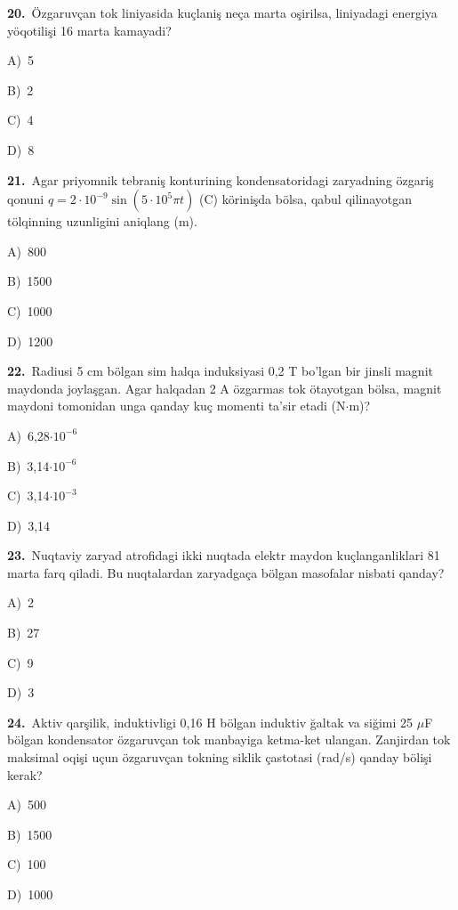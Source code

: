 \documentclass[11pt,a4paper]{article}
\newcommand{\opt}[2]{\hspace*{4mm}#1)\ #2\par}
\begin{document}
\noindent\begin{minipage}{\linewidth}
\textbf{20.}\ Özgaruvçan tok liniyasida kuçlaniş neça marta oşirilsa, liniyadagi energiya yöqotilişi 16 marta kamayadi?\par\smallskip
\opt{A}{5}
\opt{B}{2}
\opt{C}{4}
\opt{D}{8}
\end{minipage}\vspace{9pt}\par
\noindent\begin{minipage}{\linewidth}
\textbf{21.}\ Agar priyomnik tebraniş konturining kondensatoridagi zaryadning özgariş qonuni $q=2\cdot10^{-9}\sin(5\cdot10^5\pi t)$ (C) körinişda bölsa, qabul qilinayotgan tölqinning uzunligini aniqlang (m).\par\smallskip
\opt{A}{800}
\opt{B}{1500}
\opt{C}{1000}
\opt{D}{1200}
\end{minipage}\vspace{9pt}\par
\noindent\begin{minipage}{\linewidth}
\textbf{22.}\ Radiusi 5 cm bölgan sim halqa induksiyasi 0,2 T bo’lgan bir jinsli magnit maydonda joylaşgan. Agar halqadan 2 A özgarmas tok ötayotgan bölsa, magnit maydoni tomonidan unga qanday kuç momenti ta’sir etadi (N$\cdot$m)?\par\smallskip
\opt{A}{6,28$\cdot10^{-6}$}
\opt{B}{3,14$\cdot10^{-6}$}
\opt{C}{3,14$\cdot10^{-3}$}
\opt{D}{3,14}
\end{minipage}\vspace{9pt}\par
\noindent\begin{minipage}{\linewidth}
\textbf{23.}\ Nuqtaviy zaryad atrofidagi ikki nuqtada elektr maydon kuçlanganliklari 81 marta farq qiladi. Bu nuqtalardan zaryadgaça bölgan masofalar nisbati qanday?\par\smallskip
\opt{A}{2}
\opt{B}{27}
\opt{C}{9}
\opt{D}{3}
\end{minipage}\vspace{9pt}\par
\noindent\begin{minipage}{\linewidth}
\textbf{24.}\ Aktiv qarşilik, induktivligi 0,16 H bölgan induktiv ğaltak va siğimi 25 $\mu$F bölgan kondensator özgaruvçan tok manbayiga ketma-ket ulangan. Zanjirdan tok maksimal oqişi uçun özgaruvçan tokning siklik çastotasi (rad/s) qanday bölişi kerak?\par\smallskip
\opt{A}{500}
\opt{B}{1500}
\opt{C}{100}
\opt{D}{1000}
\end{minipage}\vspace{9pt}\par
\end{document}
